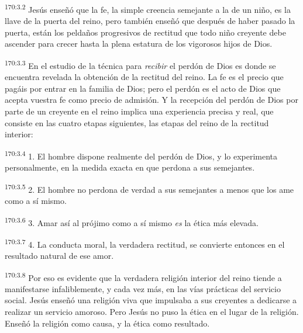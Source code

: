 \par 
\textsuperscript{170:3.2} Jesús enseñó que la fe, la simple creencia semejante a la de un niño, es la llave de la puerta del reino, pero también enseñó que después de haber pasado la puerta, están los peldaños progresivos de rectitud que todo niño creyente debe ascender para crecer hasta la plena estatura de los vigorosos hijos de Dios.

\par 
\textsuperscript{170:3.3} En el estudio de la técnica para \textit{recibir} el perdón de Dios es donde se encuentra revelada la obtención de la rectitud del reino. La fe es el precio que pagáis por entrar en la familia de Dios; pero el perdón es el acto de Dios que acepta vuestra fe como precio de admisión. Y la recepción del perdón de Dios por parte de un creyente en el reino implica una experiencia precisa y real, que consiste en las cuatro etapas siguientes, las etapas del reino de la rectitud interior:

\par 
\textsuperscript{170:3.4} 1. El hombre dispone realmente del perdón de Dios, y lo experimenta personalmente, en la medida exacta en que perdona a sus semejantes.

\par 
\textsuperscript{170:3.5} 2. El hombre no perdona de verdad a sus semejantes a menos que los ame como a sí mismo.

\par 
\textsuperscript{170:3.6} 3. Amar así al prójimo como a sí mismo \textit{es} la ética más elevada.

\par 
\textsuperscript{170:3.7} 4. La conducta moral, la verdadera rectitud, se convierte entonces en el resultado natural de ese amor.

\par 
\textsuperscript{170:3.8} Por eso es evidente que la verdadera religión interior del reino tiende a manifestarse infaliblemente, y cada vez más, en las vías prácticas del servicio social. Jesús enseñó una religión viva que impulsaba a sus creyentes a dedicarse a realizar un servicio amoroso. Pero Jesús no puso la ética en el lugar de la religión. Enseñó la religión como causa, y la ética como resultado.

